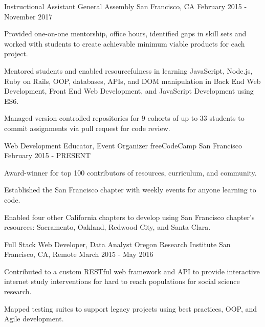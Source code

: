 \begin{cventries}
  \cventry
    {Instructional Assistant} %
    {General Assembly} %
    {San Francisco, CA} %
    {February 2015 - November 2017} %
    {
      \begin{cvitems} %
        \item {Provided one-on-one mentorship, office hours, identified gaps in skill sets and worked with students to create achievable minimum viable products for each project.}
        \item {Mentored students and enabled resourcefulness in learning JavaScript, Node.js, Ruby on Rails, OOP, databases, APIs, and DOM manipulation in Back End Web Development, Front End Web Development, and JavaScript Development using ES6.}
        \item {Managed version controlled repositories for 9 cohorts of up to 33 students to commit assignments via pull request for code review.}
      \end{cvitems}
    }

  \cventry
    {Web Development Educator, Event Organizer} %
    {freeCodeCamp} %
    {San Francisco} %
    {February 2015 - PRESENT} %
    {
      \begin{cvitems} %
        \item {Award-winner for top 100 contributors of resources, curriculum, and community.}
        \item {Established the San Francisco chapter with weekly events for anyone learning to code.}
        \item {Enabled four other California chapters to develop using San Francisco chapter's resources: Sacramento, Oakland, Redwood City, and Santa Clara.}
      \end{cvitems}
    }

  \cventry
    {Full Stack Web Developer, Data Analyst} %
    {Oregon Research Institute} %
    {San Francisco, CA, Remote} %
    {March 2015 - May 2016} %
    {
      \begin{cvitems} %
        \item {Contributed to a custom RESTful web framework and API to provide interactive internet study interventions for hard to reach populations for social science research.}
        \item {Mapped testing suites to support legacy projects using best practices, OOP, and Agile development.}
      \end{cvitems}
    }

\end{cventries}

